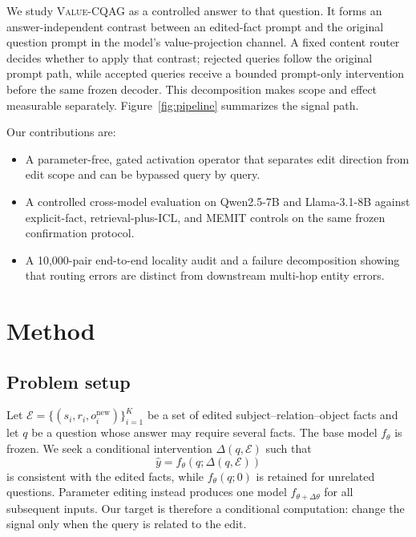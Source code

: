 \documentclass{article}
\newcommand{\method}{\textsc{Value-CQAG}}
\newcommand{\memit}{\textsc{MEMIT}}
\begin{document}
We study \method{} as a controlled answer to that question. It forms an answer-independent contrast between an edited-fact prompt and the original question prompt in the model's value-projection channel. A fixed content router decides whether to apply that contrast; rejected queries follow the original prompt path, while accepted queries receive a bounded prompt-only intervention before the same frozen decoder. This decomposition makes scope and effect measurable separately. Figure~\ref{fig:pipeline} summarizes the signal path.

Our contributions are:
\begin{itemize}
    \setlength{\itemsep}{0pt}
    \setlength{\topsep}{2pt}
    \item A parameter-free, gated activation operator that separates edit direction from edit scope and can be bypassed query by query.
    \item A controlled cross-model evaluation on Qwen2.5-7B and Llama-3.1-8B against explicit-fact, retrieval-plus-ICL, and \memit{} controls on the same frozen confirmation protocol.
    \item A 10,000-pair end-to-end locality audit and a failure decomposition showing that routing errors are distinct from downstream multi-hop entity errors.
\end{itemize}

\section{Method}
\subsection{Problem setup}
Let $\mathcal{E}=\{(s_i,r_i,o_i^{\mathrm{new}})\}_{i=1}^{K}$ be a set of edited subject--relation--object facts and let $q$ be a question whose answer may require several facts. The base model $f_\theta$ is frozen. We seek a conditional intervention $\Delta(q,\mathcal{E})$ such that
\begin{equation}
    \hat{y}=f_\theta(q;\Delta(q,\mathcal{E}))
\end{equation}
is consistent with the edited facts, while $f_\theta(q;0)$ is retained for unrelated questions. Parameter editing instead produces one model $f_{\theta+\Delta\theta}$ for all subsequent inputs. Our target is therefore a conditional computation: change the signal only when the query is related to the edit.
\end{document}
